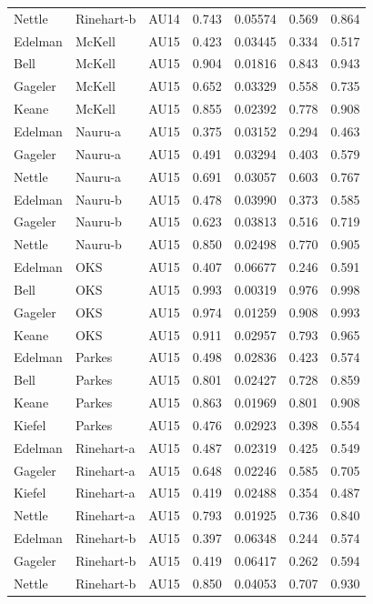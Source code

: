 \documentclass{monashthesis}
\begin{document}
\begin{center}
\begin{longtable}{lllllll}
Nettle & Rinehart-b & AU14 & 0.743 & 0.05574 & 0.569 & 0.864 \\
Edelman & McKell & AU15 & 0.423 & 0.03445 & 0.334 & 0.517 \\
Bell & McKell & AU15 & 0.904 & 0.01816 & 0.843 & 0.943 \\
Gageler & McKell & AU15 & 0.652 & 0.03329 & 0.558 & 0.735 \\
Keane & McKell & AU15 & 0.855 & 0.02392 & 0.778 & 0.908 \\
Edelman & Nauru-a & AU15 & 0.375 & 0.03152 & 0.294 & 0.463 \\
Gageler & Nauru-a & AU15 & 0.491 & 0.03294 & 0.403 & 0.579 \\
Nettle & Nauru-a & AU15 & 0.691 & 0.03057 & 0.603 & 0.767 \\
Edelman & Nauru-b & AU15 & 0.478 & 0.03990 & 0.373 & 0.585 \\
Gageler & Nauru-b & AU15 & 0.623 & 0.03813 & 0.516 & 0.719 \\
Nettle & Nauru-b & AU15 & 0.850 & 0.02498 & 0.770 & 0.905 \\
Edelman & OKS & AU15 & 0.407 & 0.06677 & 0.246 & 0.591 \\
Bell & OKS & AU15 & 0.993 & 0.00319 & 0.976 & 0.998 \\
Gageler & OKS & AU15 & 0.974 & 0.01259 & 0.908 & 0.993 \\
Keane & OKS & AU15 & 0.911 & 0.02957 & 0.793 & 0.965 \\
Edelman & Parkes & AU15 & 0.498 & 0.02836 & 0.423 & 0.574 \\
Bell & Parkes & AU15 & 0.801 & 0.02427 & 0.728 & 0.859 \\
Keane & Parkes & AU15 & 0.863 & 0.01969 & 0.801 & 0.908 \\
Kiefel & Parkes & AU15 & 0.476 & 0.02923 & 0.398 & 0.554 \\
Edelman & Rinehart-a & AU15 & 0.487 & 0.02319 & 0.425 & 0.549 \\
Gageler & Rinehart-a & AU15 & 0.648 & 0.02246 & 0.585 & 0.705 \\
Kiefel & Rinehart-a & AU15 & 0.419 & 0.02488 & 0.354 & 0.487 \\
Nettle & Rinehart-a & AU15 & 0.793 & 0.01925 & 0.736 & 0.840 \\
Edelman & Rinehart-b & AU15 & 0.397 & 0.06348 & 0.244 & 0.574 \\
Gageler & Rinehart-b & AU15 & 0.419 & 0.06417 & 0.262 & 0.594 \\
Nettle & Rinehart-b & AU15 & 0.850 & 0.04053 & 0.707 & 0.930 \\

\end{longtable}
\end{center}
\end{document}
